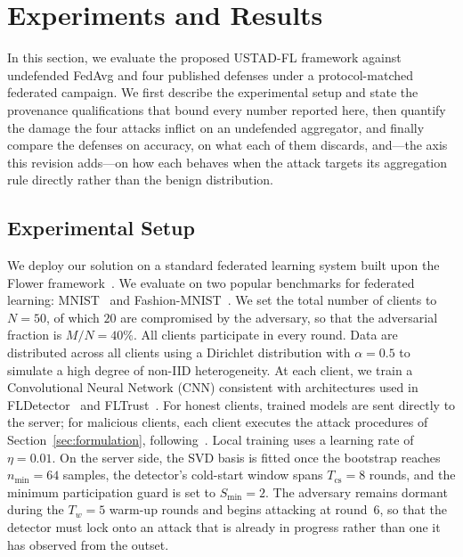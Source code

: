 \documentclass[journal]{IEEEtran}
\begin{document}
\section{Experiments and Results}
\label{sec:experiments}

In this section, we evaluate the proposed USTAD-FL framework against undefended FedAvg and
four published defenses under a protocol-matched federated campaign. We first describe the
experimental setup and state the provenance qualifications that bound every number reported
here, then quantify the damage the four attacks inflict on an undefended aggregator, and
finally compare the defenses on accuracy, on what each of them discards, and---the axis this
revision adds---on how each behaves when the attack targets its aggregation rule directly
rather than the benign distribution.

\subsection{Experimental Setup}
\label{sec:experimental_setup}

We deploy our solution on a standard federated learning system built upon the Flower framework~\cite{beutel2020flower}. We evaluate on two popular benchmarks for federated learning: MNIST~\cite{lecun1998mnist} and Fashion-MNIST~\cite{xiao2017fashion}. We set the total number of clients to $N = 50$, of which $20$ are compromised by the adversary, so that the adversarial fraction is $M/N = 40\%$. All clients participate in every round. Data are distributed across all clients using a Dirichlet distribution with $\alpha = 0.5$ to simulate a high degree of non-IID heterogeneity. At each client, we train a Convolutional Neural Network (CNN) consistent with architectures used in FLDetector~\cite{zhang2022fldetector} and FLTrust~\cite{cao2020fltrust}. For honest clients, trained models are sent directly to the server; for malicious clients, each client executes the attack procedures of Section~\ref{sec:formulation}, following~\cite{baruch2019little, shejwalkar2021manipulating, fang2020local}. Local training uses a learning rate of $\eta = 0.01$. On the server side, the SVD basis is fitted once the bootstrap reaches $n_{\min} = 64$ samples, the detector's cold-start window spans $T_{\mathrm{cs}} = 8$ rounds, and the minimum participation guard is set to $S_{\min} = 2$. The adversary remains dormant during the $T_w = 5$ warm-up rounds and begins attacking at round~$6$, so that the detector must lock onto an attack that is already in progress rather than one it has observed from the outset.
\end{document}
